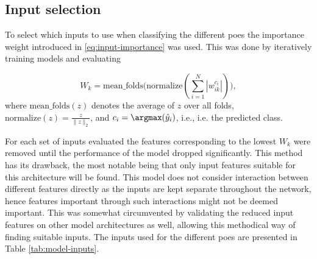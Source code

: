 
\subsection{Input selection} \label{sec:met-inputs}
To select which inputs to use when classifying the different \glspl{poe} the importance weight introduced in \eqref{eq:input-importance} was used. This was done by iteratively training models and evaluating

\begin{equation}
    W_k = \text{mean\_folds}\Big( \text{normalize}(\sum_{i=1}^N |w_{ik}^{c_i}|) \Big),
    \label{eq:feat-select}
\end{equation}
where $\text{mean\_folds}(z)$ denotes the average of $z$ over all folds, $\text{normalize}(z) = \frac{z}{\lVert z \rVert_2}$, and $c_i = \argmax(\hat{y}_i)$, i.e., i.e. the predicted class.

For each set of inputs evaluated the features corresponding to the lowest $W_k$ were removed until the performance of the model dropped significantly. This method has its drawback, the most notable being that only input features suitable for this architecture will be found. This model does not consider interaction between different features directly as the inputs are kept separate throughout the network, hence features important through such interactions might not be deemed important. This was somewhat circumvented by validating the reduced input features on other model architectures as well, allowing this methodical way of finding suitable inputs. The inputs used for the different \glspl{poe} are presented in Table \ref{tab:model-inputs}.



